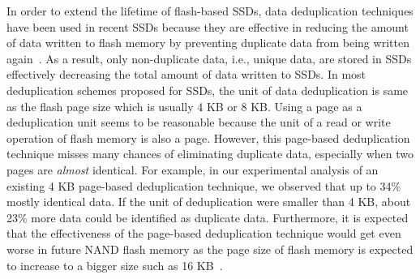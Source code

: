 In order to extend the lifetime of flash-based SSDs,
data deduplication techniques have been used in recent SSDs
because they are effective in reducing the amount of data written to flash memory by preventing duplicate data from being written again~\cite{caftl,value-locality}.
As a result, only non-duplicate data, i.e., unique data, are stored in SSDs effectively decreasing the total amount of data written to
SSDs.
In most deduplication schemes proposed for SSDs,
the unit of data deduplication is same as the flash page size which is usually 4 KB or 8 KB.
Using a page as a deduplication unit seems to be reasonable 
because the unit of a read or write operation of flash memory is also a page. 
However, this page-based deduplication technique misses many chances of eliminating duplicate data, especially
when two pages are \textit{almost} identical.
For example, in our experimental analysis of an existing 4 KB page-based deduplication technique, we observed that
up to 34\% mostly identical data.
If the unit of deduplication were smaller than 4 KB, about 23\% more data could be identified as duplicate data.
Furthermore, it is expected that the effectiveness of the page-based deduplication technique would 
get even worse in future NAND flash memory as the page size of 
flash memory is expected to increase
to a bigger size such as 16 KB~\cite{16kpage}.


